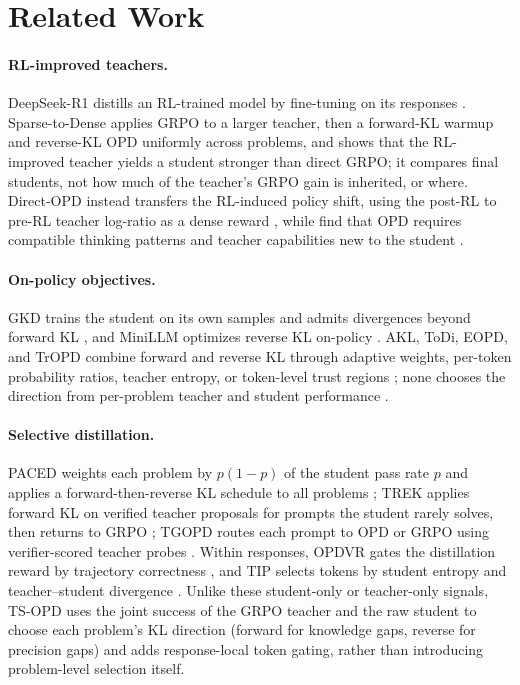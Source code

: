 \documentclass[10pt]{article}
\newcommand{\tsopd}{TS-OPD}
\begin{document}
\section{Related Work}
\label{sec:related}

\paragraph{RL-improved teachers.}
DeepSeek-R1 distills an RL-trained model by fine-tuning on its responses
\citep{guo2025deepseekr1}. Sparse-to-Dense \citep{sang2026beyond}
applies GRPO \citep{shao2024deepseekmath} to a larger teacher, then a
forward-KL warmup and reverse-KL OPD uniformly across problems, and shows that
the RL-improved teacher yields a student stronger than direct GRPO; it compares
final students, not how much of the teacher's GRPO gain is inherited, or where. Direct-OPD instead transfers the
RL-induced policy shift, using the post-RL to pre-RL teacher log-ratio as a
dense reward \citep{feng2026directopd}, while
\citet{li2026rethinking} find that OPD requires compatible thinking patterns
and teacher capabilities new to the student
\citep{li2025small,zhang2025law,yue2025does}.

\paragraph{On-policy objectives.}
GKD trains the student on its own samples and admits divergences beyond forward
KL \citep{agarwal2024opd}, and MiniLLM optimizes reverse KL on-policy
\citep{gu2024minillm}. AKL, ToDi, EOPD, and TrOPD combine forward and reverse
KL through adaptive weights, per-token probability ratios, teacher entropy, or
token-level trust regions
\citep{wu2025akl,jung2025todi,jin2026entropy,xing2026trust}; none chooses the
direction from per-problem teacher and student performance
\citep{ko2024distillm,ko2025distillm2,wang2025abkd}.

\paragraph{Selective distillation.}
PACED weights each problem by $p(1-p)$ of the student pass rate $p$ and applies
a forward-then-reverse KL schedule to all problems \citep{xu2026paced}; TREK
applies forward KL on verified teacher proposals for prompts the student rarely
solves, then returns to GRPO \citep{xu2026trek,yan2025luffy}; TGOPD routes each prompt to OPD
or GRPO using verifier-scored teacher probes \citep{zhang2026verifydistill}.
Within responses, OPDVR gates the distillation reward by trajectory correctness
\citep{lin2026opdvr}, and TIP selects tokens by student entropy and
teacher--student divergence \citep{xu2026tip,wang2025beyond8020,lin2024rho1}.
Unlike these student-only or teacher-only signals, \tsopd{} uses the joint
success of the GRPO teacher and the raw student to choose each problem's
KL direction (forward for knowledge gaps, reverse for precision gaps) and adds
response-local token gating, rather than introducing problem-level selection
itself.
\end{document}
